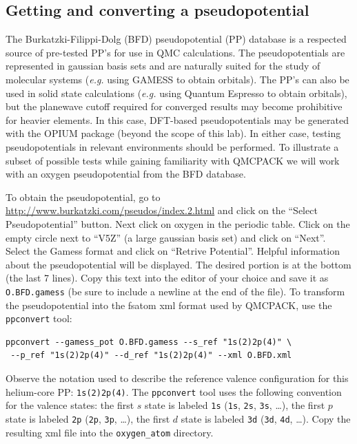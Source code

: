 \subsection{Getting and converting a pseudopotential}\label{sec:pseudo}
The Burkatzki-Filippi-Dolg (BFD) pseudopotential (PP) database is a respected 
source of pre-tested PP's for use in QMC calculations.  The pseudopotentials 
are represented in gaussian basis sets and are naturally suited for the study 
of molecular systems (\emph{e.g.} using GAMESS to obtain orbitals).  The PP's 
can also be used in solid state calculations (\emph{e.g.} using Quantum Espresso 
to obtain orbitals), but the planewave cutoff required for converged results may 
become prohibitive for heavier elements.  In this case, DFT-based 
pseudopotentials may be generated with the OPIUM package (beyond the scope of 
this lab).  In either case, testing pseudopotentials in relevant environments 
should be performed.  To illustrate a subset of possible tests while gaining 
familiarity with QMCPACK we will work with an oxygen pseudopotential from the 
BFD database.  

To obtain the pseudopotential, go to \href{http://www.burkatzki.com/pseudos/index.2.html}{http://www.burkatzki.com/pseudos/index.2.html}
and click on the ``Select Pseudopotential'' button.  Next click on oxygen in the 
periodic table.  Click on the empty circle next to ``V5Z'' (a large gaussian 
basis set) and click on ``Next''.  Select the Gamess format and click on 
``Retrive Potential''.  Helpful information about the pseudopotential will be 
displayed.  The desired portion is at the bottom (the last 7 lines).  Copy 
this text into the editor of your choice and save it as \texttt{O.BFD.gamess} 
(be sure to include a newline at the end of the file).  To transform the 
pseudopotential into the fsatom xml format used by QMCPACK, use the \texttt{ppconvert} 
tool:
\begin{shaded}
\begin{verbatim}
ppconvert --gamess_pot O.BFD.gamess --s_ref "1s(2)2p(4)" \
 --p_ref "1s(2)2p(4)" --d_ref "1s(2)2p(4)" --xml O.BFD.xml
\end{verbatim}
\end{shaded}
\noindent
Observe the notation used to describe the reference valence configuration for this helium-core PP: \texttt{1s(2)2p(4)}.  The \texttt{ppconvert} tool uses the following convention for the valence states: the first $s$ state is labeled \texttt{1s} (\texttt{1s}, \texttt{2s}, \texttt{3s}, \ldots), the first $p$ state is labeled \texttt{2p} (\texttt{2p}, \texttt{3p}, \ldots), the first $d$ state is labeled \texttt{3d} (\texttt{3d}, \texttt{4d}, \ldots). Copy the resulting xml file into the \texttt{oxygen\_atom} directory.


